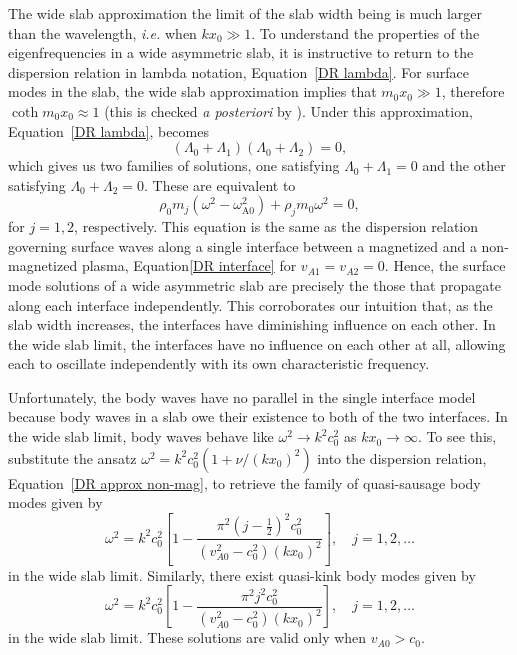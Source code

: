 \documentclass[12pt,draft]{../style-files/ociamthesis}
\begin{document}
The wide slab approximation the limit of the slab width being is much larger than the wavelength, \textit{i.e.} when $kx_0 \gg 1$. To understand the properties of the eigenfrequencies in a wide asymmetric slab, it is instructive to return to the dispersion relation in lambda notation, Equation~\eqref{DR lambda}. For surface modes in the slab, the wide slab approximation implies that $m_0x_0 \gg 1$, therefore $\coth{m_0x_0} \approx 1$ (this is checked \textit{a posteriori} by \cite{rob81b}). Under this approximation, Equation~\eqref{DR lambda}, becomes
\begin{equation}
(\Lambda_0 + \Lambda_1)(\Lambda_0 + \Lambda_2) = 0,
\end{equation}
which gives us two families of solutions, one satisfying $\Lambda_0 + \Lambda_1 = 0$ and the other satisfying $\Lambda_0 + \Lambda_2 = 0$. These are equivalent to
\begin{equation}
	\rho_0m_j(\omega^2 - \omega_\textrm{A0}^2) + \rho_jm_0\omega^2 = 0,
\end{equation}
for $j = 1, 2$, respectively. This equation is the same as the dispersion relation governing surface waves along a single interface between a magnetized and a non-magnetized plasma, Equation\eqref{DR interface} for $v_{A1} = v_{A2} = 0$. Hence, the surface mode solutions of a wide asymmetric slab are precisely the those that propagate along each interface independently. This corroborates our intuition that, as the slab width increases, the interfaces have diminishing influence on each other. In the wide slab limit, the interfaces have no influence on each other at all, allowing each to oscillate independently with its own characteristic frequency.

Unfortunately, the body waves have no parallel in the single interface model because body waves in a slab owe their existence to both of the two interfaces. In the wide slab limit, body waves behave like $\omega^2 \to k^2c_0^2$ as $kx_0 \to \infty$. To see this, substitute the ansatz $\omega^2 = k^2c_0^2 \left(1 + \nu/(kx_0)^2\right)$ into the dispersion relation, Equation~\eqref{DR approx non-mag}, to retrieve the family of quasi-sausage body modes given by
\begin{equation}
\omega^2 = k^2c_0^2\left[1 - \frac{\pi^2(j - \frac{1}{2})^2c_0^2}{(v_{A0}^2 - c_0^2)(kx_0)^2}\right], \quad j = 1, 2, \ldots \label{wide slab saus body}
\end{equation}
in the wide slab limit. Similarly, there exist quasi-kink body modes given by
\begin{equation}
\omega^2 = k^2c_0^2\left[1 - \frac{\pi^2j^2c_0^2}{(v_{A0}^2 - c_0^2)(kx_0)^2}\right], \quad j = 1, 2, \ldots \label{wide slab kink body}
\end{equation}
in the wide slab limit. These solutions are valid only when $v_{A0} > c_0$.
\end{document}
